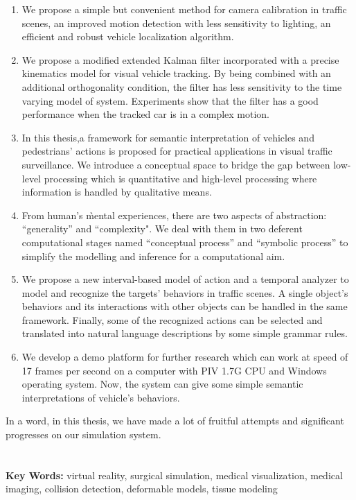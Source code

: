 \begin{enumerate}
    \item We propose a simple but convenient method for camera calibration in
    traffic scenes, an improved motion detection with less sensitivity to lighting,
    an efficient and robust vehicle localization algorithm.
    \item We propose a modified extended Kalman filter incorporated with a precise
    kinematics model for visual vehicle tracking. By being combined with an additional orthogonality
    condition, the filter has less sensitivity to the time varying model of system. Experiments
    show that the filter has a good performance when the tracked car is in a complex motion.
    \item In this thesis,a framework for semantic interpretation of vehicles and pedestrians'
    actions is proposed for practical applications in visual traffic surveillance.  We introduce
    a conceptual space to bridge the gap between low-level processing which is quantitative
    and high-level processing where information is handled by qualitative means.
    \item From human's \`mental experiences, there are two aspects of abstraction: ``generality'' and
    ``complexity". We deal with them in two deferent computational stages named ``conceptual process'' and ``symbolic process'' to
    simplify the modelling and inference for a computational aim.
    \item We propose a new interval-based model of action and a temporal analyzer to model and
    recognize the targets' behaviors in traffic scenes. A single object's behaviors and its
    interactions with other objects can be handled in the same framework. Finally, some of the recognized
    actions can be selected and translated into natural language descriptions by some simple grammar
    rules.
    \item We develop a demo platform for further research which can work at
    speed of 17 frames per second on a computer with PIV 1.7G CPU and Windows
    operating system. Now, the system can give some simple semantic interpretations
    of vehicle's behaviors.
\end{enumerate}

In a word, in this thesis, we have made a lot of fruitful attempts and significant
progresses on our simulation system.
\\
\\
\\
\noindent \textbf{Key Words:} virtual reality, surgical simulation, medical
visualization, medical imaging, collision detection, deformable models, tissue modeling
